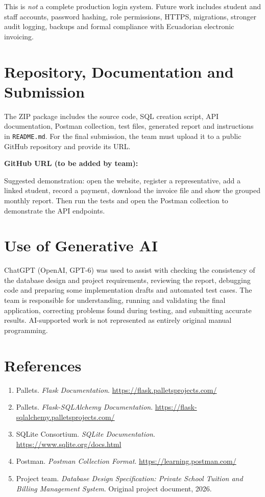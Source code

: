 \documentclass[11pt,letterpaper]{article}
\begin{document}
This is \emph{not} a complete production login system. Future work includes student and staff accounts, password hashing, role permissions, HTTPS, migrations, stronger audit logging, backups and formal compliance with Ecuadorian electronic invoicing.

\section{Repository, Documentation and Submission}
The ZIP package includes the source code, SQL creation script, API documentation, Postman collection, test files, generated report and instructions in \texttt{README.md}. For the final submission, the team must upload it to a public GitHub repository and provide its URL.

\textbf{GitHub URL (to be added by team):} \underline{\hspace{10.0cm}}

Suggested demonstration: open the website, register a representative, add a linked student, record a payment, download the invoice file and show the grouped monthly report. Then run the tests and open the Postman collection to demonstrate the API endpoints.

\section{Use of Generative AI}
ChatGPT (OpenAI, GPT-6) was used to assist with checking the consistency of the database design and project requirements, reviewing the report, debugging code and preparing some implementation drafts and automated test cases. The team is responsible for understanding, running and validating the final application, correcting problems found during testing, and submitting accurate results. AI-supported work is not represented as entirely original manual programming.

\section{References}
\begin{enumerate}[leftmargin=*]
\item Pallets. \textit{Flask Documentation}. \url{https://flask.palletsprojects.com/}
\item Pallets. \textit{Flask-SQLAlchemy Documentation}. \url{https://flask-sqlalchemy.palletsprojects.com/}
\item SQLite Consortium. \textit{SQLite Documentation}. \url{https://www.sqlite.org/docs.html}
\item Postman. \textit{Postman Collection Format}. \url{https://learning.postman.com/}
\item Project team. \textit{Database Design Specification: Private School Tuition and Billing Management System}. Original project document, 2026.
\end{enumerate}
\end{document}
